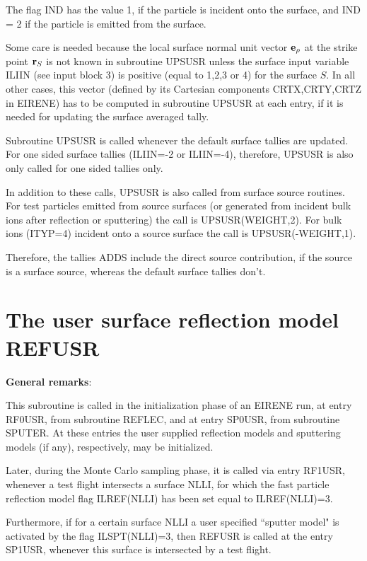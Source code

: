 The flag IND has the value 1, if the particle is incident onto the surface, and
IND = 2 if the particle is emitted from the surface.

Some care is needed because the local surface normal unit vector $ \mathbf{e}_{\rho} $
at the strike point $ \mathbf{r}_S $ is not known in subroutine UPSUSR unless the
surface input variable ILIIN (see input block 3) is positive (equal to 1,2,3 or
4) for the surface $S$.
In all other cases, this vector (defined by its Cartesian components
CRTX,CRTY,CRTZ in EIRENE) has to be computed in subroutine UPSUSR at each
entry, if it is needed for updating the surface averaged tally.

Subroutine UPSUSR is called whenever the default surface tallies are updated.
For one sided surface tallies (ILIIN=-2 or ILIIN=-4), therefore, UPSUSR is also
only called for one sided tallies only.

In addition to these calls, UPSUSR is also called from surface source routines.
For test particles emitted from source surfaces (or generated from incident
bulk ions after reflection or sputtering) the call is UPSUSR(WEIGHT,2).
For bulk ions (ITYP=4) incident onto a source surface the call is
UPSUSR(-WEIGHT,1).

Therefore, the tallies ADDS include the direct source contribution, if the
source is a surface source, whereas the default surface tallies don't.
\newpage

\section{The user surface reflection model REFUSR} \label{sec3.3}

\textbf{General remarks}:

\medskip

This subroutine is called in the initialization phase of an EIRENE run, at
entry RF0USR, from subroutine REFLEC, and at entry SP0USR, from subroutine
SPUTER.
At these entries the user supplied reflection models and sputtering models (if
any), respectively, may be initialized.

Later, during the Monte Carlo sampling phase, it is called via entry RF1USR,
whenever a test flight intersects a surface NLLI, for which the fast particle
reflection model flag ILREF(NLLI) has been set equal to ILREF(NLLI)=3.

Furthermore, if for a certain surface NLLI a user specified ``sputter model" is
activated by the flag ILSPT(NLLI)=3, then REFUSR is called at the entry SP1USR,
whenever this surface is intersected by a test flight.

